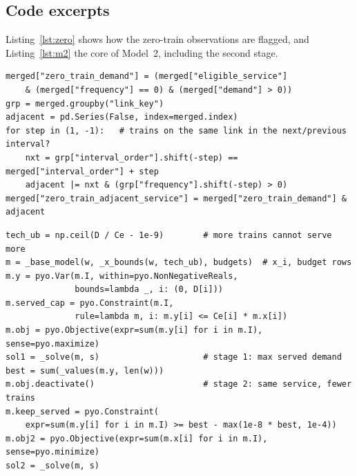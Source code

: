 \documentclass[conference]{IEEEtran}
\begin{document}
\subsection{Code excerpts}
Listing~\ref{lst:zero} shows how the zero-train observations are flagged, and Listing~\ref{lst:m2} the core of
Model~2, including the second stage.

\begin{lstlisting}[style=py, float=tp, caption={Flagging zero-train demand (\texttt{preprocessing.py}).}, label={lst:zero}]
merged["zero_train_demand"] = (merged["eligible_service"]
    & (merged["frequency"] == 0) & (merged["demand"] > 0))
grp = merged.groupby("link_key")
adjacent = pd.Series(False, index=merged.index)
for step in (1, -1):   # trains on the same link in the next/previous interval?
    nxt = grp["interval_order"].shift(-step) == merged["interval_order"] + step
    adjacent |= nxt & (grp["frequency"].shift(-step) > 0)
merged["zero_train_adjacent_service"] = merged["zero_train_demand"] & adjacent
\end{lstlisting}

\begin{lstlisting}[style=py, float=tp, caption={Two-stage Model 2 in Pyomo (\texttt{optimization.py}).}, label={lst:m2}]
tech_ub = np.ceil(D / Ce - 1e-9)        # more trains cannot serve more
m = _base_model(w, _x_bounds(w, tech_ub), budgets)  # x_i, budget rows
m.y = pyo.Var(m.I, within=pyo.NonNegativeReals,
              bounds=lambda _, i: (0, D[i]))
m.served_cap = pyo.Constraint(m.I,
              rule=lambda m, i: m.y[i] <= Ce[i] * m.x[i])
m.obj = pyo.Objective(expr=sum(m.y[i] for i in m.I), sense=pyo.maximize)
sol1 = _solve(m, s)                     # stage 1: max served demand
best = sum(_values(m.y, len(w)))
m.obj.deactivate()                      # stage 2: same service, fewer trains
m.keep_served = pyo.Constraint(
    expr=sum(m.y[i] for i in m.I) >= best - max(1e-8 * best, 1e-4))
m.obj2 = pyo.Objective(expr=sum(m.x[i] for i in m.I), sense=pyo.minimize)
sol2 = _solve(m, s)
\end{lstlisting}
\end{document}
